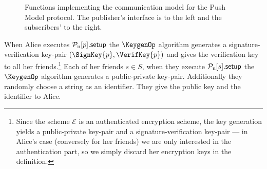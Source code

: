 \begin{figure}%
  \caption{%
    Functions implementing the communication model for the Push Model protocol.
    The publisher's interface is to the left and the subscribers' to the right.
  }\label{PushFunctions}
\end{figure}

When Alice executes \(\pnsetup{p}\) the \(\KeygenOp\) algorithm generates 
a signature-verification key-pair \((\SignKey{p}, \VerifKey{p})\) and gives the 
verification key to all her friends.\footnote{%
  Since the scheme \(\mathcal{E}\) is an authenticated encryption scheme, the 
  key generation yields a public-private key-pair and a signature-verification 
  key-pair --- in Alice's case (conversely for her friends) we are only 
  interested in the authentication part, so we simply discard her encryption 
  keys in the definition.
}
Each of her friends \(s\in S\), when they execute \(\pnsetup{s}\) the 
\(\KeygenOp\) algorithm generates a public-private key-pair.
Additionally they randomly choose a string as an identifier.
They give the public key and the identifier to Alice.

